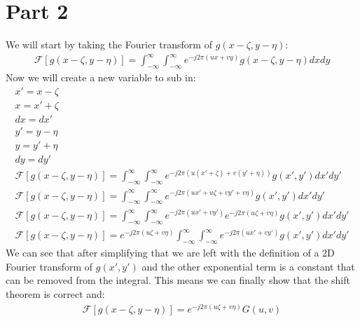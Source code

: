 \documentclass[12 pt]{article}
\begin{document}
\section*{Part 2}
We will start by taking the Fourier transform of $g(x-\zeta, y-\eta)$:
\begin{align*}
    \mathcal{F}\left[g(x-\zeta, y-\eta)\right]=\int_{-\infty}^{\infty}\int_{-\infty}^{\infty}e^{-j2\pi(ux+vy)}g(x-\zeta, y-\eta)dxdy
\end{align*}
Now we will create a new variable to sub in:
\begin{align*}
    x'=x-\zeta \\
    x = x'+\zeta \\
    dx = dx' \\
    y'=y-\eta \\
    y  =y'+\eta \\
    dy = dy' \\
    \mathcal{F}\left[g(x-\zeta, y-\eta)\right] = \int_{-\infty}^{\infty}\int_{-\infty}^{\infty}
    e^{-j2\pi(u(x'+\zeta) + v(y'+\eta))}g(x', y')dx'dy' \\
    \mathcal{F}\left[g(x-\zeta, y-\eta)\right] = \int_{-\infty}^{\infty}\int_{-\infty}^{\infty}
    e^{-j2\pi(ux'+u\zeta + vy'+v\eta)}g(x', y')dx'dy' \\
    \mathcal{F}\left[g(x-\zeta, y-\eta)\right] = \int_{-\infty}^{\infty}\int_{-\infty}^{\infty}
    e^{-j2\pi(ux'+vy')}e^{-j2\pi(u\zeta + v\eta)}g(x', y')dx'dy' \\
    \mathcal{F}\left[g(x-\zeta, y-\eta)\right] = e^{-j2\pi(u\zeta + v\eta)}\int_{-\infty}^{\infty}\int_{-\infty}^{\infty}
    e^{-j2\pi(ux'+vy')}g(x', y')dx'dy'
\end{align*}
We can see that after simplifying that we are left with the definition of a 2D Fourier transform of $g(x', y')$ and the
other exponential term is a constant that can be removed from the integral. This means we can finally show that the
shift theorem is correct and:
\begin{align*}
    \mathcal{F}\left[g(x-\zeta, y-\eta)\right] = e^{-j2\pi(u\zeta + v\eta)}G(u, v)
\end{align*}
\end{document}
